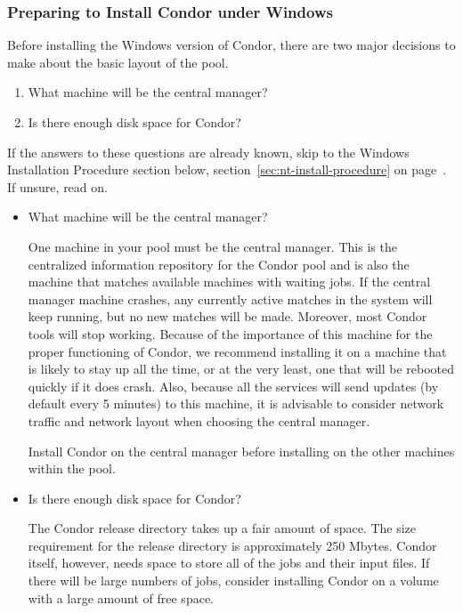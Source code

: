 \subsubsection{\label{sec:NT-Preparing-to-Install}Preparing to Install
Condor under Windows } 

Before installing the Windows version of Condor,
there are two major
decisions to make about the basic layout of the pool.

\begin{enumerate}
\item What machine will be the central manager?
\item Is there enough disk space for Condor?
\end{enumerate}

If the answers to these questions are already known,
skip to the Windows Installation Procedure section below,
section~\ref{sec:nt-install-procedure} on
page~\pageref{sec:nt-install-procedure}.
If unsure, read on.

\begin{itemize} 

\item{What machine will be the central manager?}

One machine in your pool must be the central manager.
This is the
centralized information repository for the Condor pool and is also the
machine that matches available machines with waiting
jobs.  If the central manager machine crashes, any currently active
matches in the system will keep running, but no new matches will be
made.  Moreover, most Condor tools will stop working.  Because of the
importance of this machine for the proper functioning of Condor, we
recommend installing it on a machine that is likely to stay up all the
time, or at the very least, one that will be rebooted quickly if it
does crash.  Also, because all the services will send updates (by
default every 5 minutes) to this machine, it is advisable to consider
network traffic and network layout when choosing the central
manager.

Install Condor on the central manager before installing
on the other machines within the pool.

\item{Is there enough disk space for Condor?}

The Condor release directory takes up a fair amount of space.
The size requirement for the release
directory is approximately 250 Mbytes.
Condor itself, however, needs space to store all of the jobs and their
input files.  If there will be large numbers of jobs,
consider installing Condor on a volume with a large amount
of free space.

\end{itemize}


